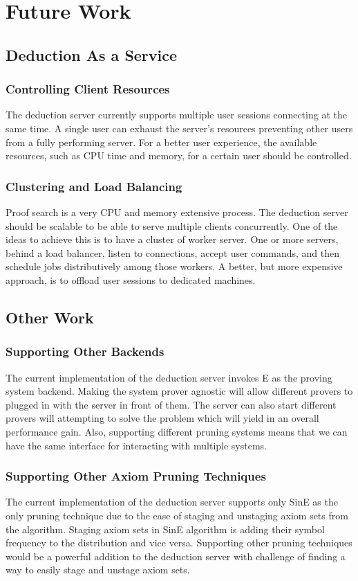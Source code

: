 \chapter{Future Work}
\label{chap:todo}

\section{Deduction As a Service}

\subsection{Controlling Client Resources}
The deduction server currently supports multiple user sessions connecting at the same time. A single user can exhaust the server's resources preventing other users from a fully performing server. For a better user experience, the available resources, such as CPU time and memory, for a certain user should be controlled.

\subsection{Clustering and Load Balancing}
Proof search is a very CPU and memory extensive process. The deduction server should be scalable to be able to serve multiple clients concurrently. One of the ideas to achieve this is to have a cluster of worker server. One or more servers, behind a load balancer, listen to connections, accept user commands, and then schedule jobs distributively among those workers. A better, but more expensive approach, is to offload user sessions to dedicated machines.


\section{Other Work}
\subsection{Supporting Other Backends}
The current implementation of the deduction server invokes E as the proving system backend. Making the system prover agnostic will allow different provers to plugged in with the server in front of them. The server can also start different provers will attempting to solve the problem which will yield in an overall performance gain. Also, supporting different pruning systems means that we can have the same interface for interacting with multiple systems.

\subsection{Supporting Other Axiom Pruning Techniques}
The current implementation of the deduction server supports only SinE as the only pruning technique due to the ease of staging and unstaging axiom sets from the algorithm. Staging axiom sets in SinE algorithm is adding their symbol frequency to the distribution and vice versa. Supporting other pruning techniques would be a powerful addition to the deduction server with challenge of finding a way to easily stage and unstage axiom sets.

